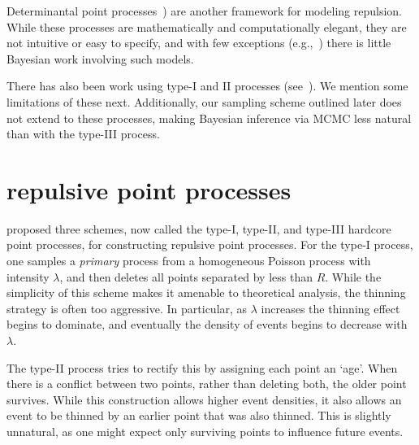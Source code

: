 \documentclass{statsoc}
\begin{document}
Determinantal point processes~\citep{hough_dpp,Scardicchio09}) are another framework for modeling repulsion. While
these processes are mathematically and computationally elegant, they are not intuitive or easy to specify, and with few exceptions (e.g.,~\citet{affandi2014learning}) there is little Bayesian work involving such models. %


There has also been work using \matern type-I and II processes (see~\cite{WallSar11}). We mention some limitations of these next. Additionally,
our sampling scheme outlined later does not extend to these processes, making Bayesian inference via MCMC less natural than with the
type-III process.

\section{\matern repulsive point processes}

\cite{Matern60} proposed three schemes, now called the \matern type-I, type-II, and type-III hardcore point processes,
for constructing repulsive point processes.
For the type-I process, one samples a \emph{primary} process from a homogeneous Poisson process 
with intensity $\lambda$, and then deletes all points separated by less than $R$. While the simplicity of this scheme makes it amenable to theoretical 
analysis, the thinning strategy is often too aggressive. In particular, %
as $\lambda$ increases the thinning effect begins to dominate, and eventually the density of \matern events begins to {decrease} with $\lambda$.

The \matern type-II process tries to rectify this by assigning each point an `age'.
When there is a conflict between two points, 
rather than deleting {both}, the older point survives. While this construction allows higher event densities, it also allows 
an event to be thinned by an earlier point that was also thinned. This is slightly unnatural, as one might expect only surviving points to influence 
future events. 
\end{document}
